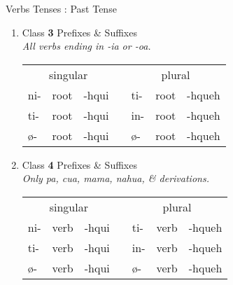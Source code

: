 \documentclass[12pt]{beamer}
\newcommand{\nah}[1]{\textcolor{nahgrn}{#1}}
\newcommand{\trs}[1]{\textcolor{nahblu}{#1}}
\begin{document}
\begin{frame}
\begin{columns}[t]
\begin{column}{.26\linewidth}
\begin{block}{Verbs Tenses : Past Tense}
\begin{enumerate}
\begin{tabular}[t]{lllllll}
					\end{tabular}
					\item Class \textbf{3} \nah{Prefixes} \& \trs{Suffixes} 			\\
					\textit{All verbs ending in -ia or -oa.}							\\
					\begin{tabular}[t]{lllllll}
						\multicolumn{3}{c}{singular}    & \vline & \multicolumn{3}{c}{plural}        	\\
						\cline{1-7}
						\nah{ni-}   & root & \trs{-hqui}   & \vline & \nah{ti-}   & root & \trs{-hqueh} \\
						\nah{ti-}   & root & \trs{-hqui}   & \vline & \nah{in-}   & root & \trs{-hqueh} \\
						\nah{ø-}    & root & \trs{-hqui}   & \vline & \nah{ø-}    & root & \trs{-hqueh} \\
					\end{tabular}%
					\item Class \textbf{4} \nah{Prefixes} \& \trs{Suffixes} \\
					\textit{Only pa, cua, mama, nahua, \& derivations.}		\\
					\begin{tabular}[t]{lllllll} 
						\multicolumn{3}{c}{singular}    & \vline & \multicolumn{3}{c}{plural}        	\\
						\cline{1-7}
						\nah{ni-}   & verb & \trs{-hqui}   & \vline & \nah{ti-}   & verb & \trs{-hqueh} \\
						\nah{ti-}   & verb & \trs{-hqui}   & \vline & \nah{in-}   & verb & \trs{-hqueh} \\
						\nah{ø-}    & verb & \trs{-hqui}   & \vline & \nah{ø-}    & verb & \trs{-hqueh} \\
					\end{tabular}
				\end{enumerate}
			\end{block}
		\end{column}
		

\end{columns}
\end{frame}
\end{document}

